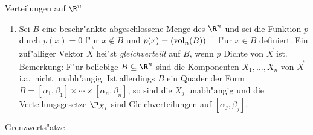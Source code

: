 \item
{\large Verteilungen auf ${\R}^n$}
\begin{enumerate}
\item
Sei $B$ eine beschr"ankte abgeschlossene Menge des $\R^n$ und sei
die Funktion $p$ durch $p(x)=0$ f"ur $x\notin B$ und $p(x)=({\rm
vol}_n(B))^{-1}$ f"ur $x\in B$ definiert. Ein zuf"alliger Vektor
$\vec X$ hei"st {\it gleichverteilt} auf $B$, wenn $p$ Dichte von
$\vec X$ ist. \newline Bemerkung: F"ur beliebige $B\subseteq\R^n$
sind die Komponenten $X_1,\ldots,X_n$ von $\vec X$ i.a.~nicht
unabh"angig. Ist allerdings $B$ ein Quader der Form
$B=[\alpha_1,\beta_1]\times\cdots\times[\alpha_n, \beta_n]$, so sind
die $X_j$ unabh"angig und die Verteilungsgesetze $\P_{X_j}$ sind
Gleichverteilungen auf $[\alpha_j,\beta_j]$.
\end{enumerate}
\item
{\large Grenzwerts"atze}
